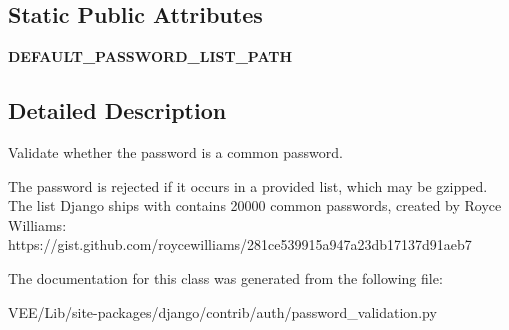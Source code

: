 \subsection*{Static Public Attributes}
\begin{DoxyCompactItemize}
\item 
\mbox{\label{classdjango_1_1contrib_1_1auth_1_1password__validation_1_1_common_password_validator_ad38d3b51acff9e33833c7bf2e74db3bf}} 
{\bfseries D\+E\+F\+A\+U\+L\+T\+\_\+\+P\+A\+S\+S\+W\+O\+R\+D\+\_\+\+L\+I\+S\+T\+\_\+\+P\+A\+TH}
\end{DoxyCompactItemize}


\subsection{Detailed Description}
\begin{DoxyVerb}Validate whether the password is a common password.

The password is rejected if it occurs in a provided list, which may be gzipped.
The list Django ships with contains 20000 common passwords, created by
Royce Williams: https://gist.github.com/roycewilliams/281ce539915a947a23db17137d91aeb7
\end{DoxyVerb}
 

The documentation for this class was generated from the following file\+:\begin{DoxyCompactItemize}
\item 
V\+E\+E/\+Lib/site-\/packages/django/contrib/auth/password\+\_\+validation.\+py\end{DoxyCompactItemize}
